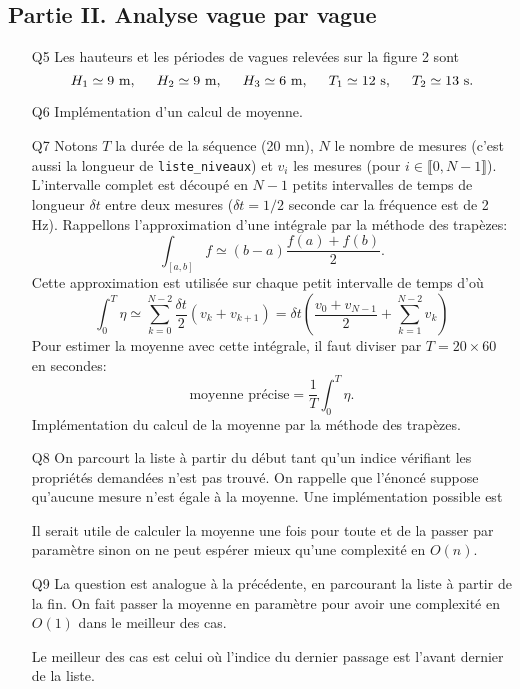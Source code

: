 \subsection*{Partie II. Analyse \og vague par vague\fg}
\begin{itemize}
 \item[Q5] Les hauteurs et les périodes de vagues relevées sur la figure 2 sont
 \[
  H_1 \simeq 9 \text{ m}, \hspace{0.5cm} H_2 \simeq 9 \text{ m}, \hspace{0.5cm} H_3 \simeq 6 \text{ m}, \hspace{0.5cm}T_1 \simeq 12 \text{ s}, \hspace{0.5cm} T_2 \simeq 13 \text{ s}.
 \]
 \item[Q6]Implémentation d'un calcul de moyenne.

\item[Q7] Notons $T$ la durée de la séquence (20 mn), $N$ le nombre de mesures (c'est aussi la longueur de \texttt{liste\_niveaux}) et $v_i$ les mesures (pour $i \in \llbracket 0, N-1\rrbracket$). L'intervalle complet est découpé en $N-1$ petits intervalles de temps de longueur $\delta t$ entre deux mesures ($\delta t = 1/2$ seconde car la fréquence est de 2 Hz).
Rappellons l'approximation d'une intégrale par la méthode des trapèzes:
\[
 \int_{\left[ a,b\right] }f \simeq (b-a)\frac{f(a) + f(b)}{2}.
\]
Cette approximation est utilisée sur chaque petit intervalle de temps d'où
\[
 \int_{0}^{T} \eta \simeq \sum_{k=0}^{N-2}\frac{\delta t}{2}(v_k + v_{k+1})
 = \delta t\left( \frac{v_0 + v_{N-1}}{2} + \sum_{k=1}^{N-2} v_k\right) 
\]
Pour estimer la moyenne avec cette intégrale, il faut diviser par $T = 20 \times 60$ en secondes:
\[
 \text{moyenne précise} = \frac{1}{T} \int_{0}^{T} \eta.
\]
Implémentation du calcul de la moyenne par la méthode des trapèzes.


 \item[Q8] On parcourt la liste à partir du début tant qu'un indice vérifiant les propriétés demandées n'est pas trouvé. On rappelle que l'énoncé suppose qu'aucune mesure n'est égale à la moyenne. Une implémentation possible est 

Il serait utile de calculer la moyenne une fois pour toute et de la passer par paramètre sinon on ne peut espérer mieux qu'une complexité en $O(n)$.

 \item[Q9] La question est analogue à la précédente, en parcourant la liste à partir de la fin. On fait passer la moyenne en paramètre pour avoir une complexité en $O(1)$ dans le meilleur des cas.

Le meilleur des cas est celui où l'indice du dernier passage est l'avant dernier de la liste.


\end{itemize}
